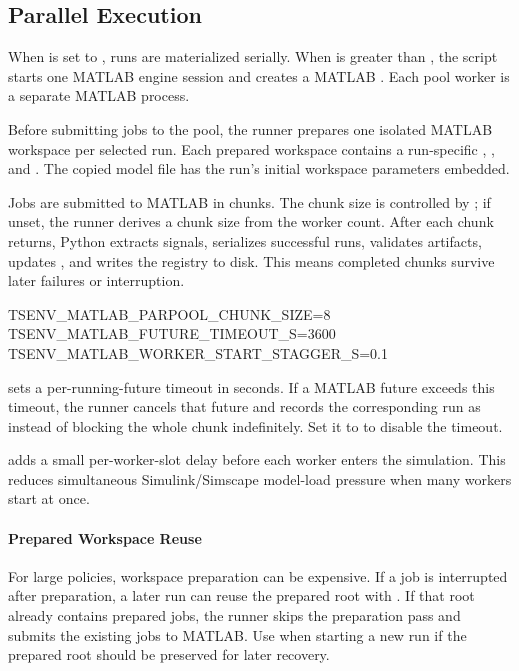 \documentclass[11pt]{article}
\begin{document}
\subsection*{Parallel Execution}

When  is set to , runs are materialized serially.
When  is greater than , the script starts one MATLAB engine session and creates a MATLAB .
Each pool worker is a separate MATLAB process.

Before submitting jobs to the pool, the runner prepares one isolated MATLAB workspace per selected run.
Each prepared workspace contains a run-specific , , and .
The copied model file has the run's initial workspace parameters embedded.

Jobs are submitted to MATLAB in chunks.
The chunk size is controlled by ; if unset, the runner derives a chunk size from the worker count.
After each chunk returns, Python extracts signals, serializes successful runs, validates artifacts, updates , and writes the registry to disk.
This means completed chunks survive later failures or interruption.

\begin{DocCode}
TSENV_MATLAB_PARPOOL_CHUNK_SIZE=8
TSENV_MATLAB_FUTURE_TIMEOUT_S=3600
TSENV_MATLAB_WORKER_START_STAGGER_S=0.1
\end{DocCode}

 sets a per-running-future timeout in seconds.
If a MATLAB future exceeds this timeout, the runner cancels that future and records the corresponding run as  instead of blocking the whole chunk indefinitely.
Set it to  to disable the timeout.

 adds a small per-worker-slot delay before each worker enters the simulation.
This reduces simultaneous Simulink/Simscape model-load pressure when many workers start at once.

\paragraph{Prepared Workspace Reuse}
For large policies, workspace preparation can be expensive.
If a job is interrupted after preparation, a later run can reuse the prepared root with .
If that root already contains prepared jobs, the runner skips the preparation pass and submits the existing jobs to MATLAB.
Use  when starting a new run if the prepared root should be preserved for later recovery.
\end{document}
